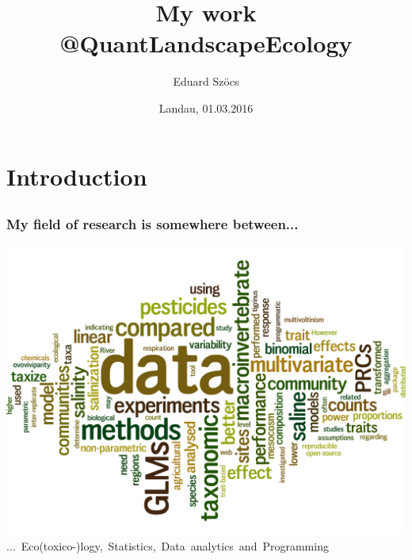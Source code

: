 \documentclass[12pt, t]{beamer}
\title{My work @QuantLandscapeEcology}
\author{Eduard Szöcs}
\institute{Institute for Environmental Sciences, University of Koblenz-Landau}
\date{Landau, 01.03.2016}
\begin{document}
\begin{frame}
\titlepage
\end{frame}


\section{Introduction} 
\subsection{}
\begin{frame}
\frametitle{My field of research is somewhere between...}
\center
\includegraphics[width =.8\textwidth]{fig/wordcloud_abstracts_firstauthor.png} \\	
\mbox{... Eco(toxico-)logy, Statistics, Data analytics and Programming}
\end{frame}
\end{document}
